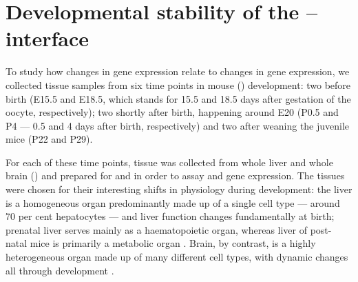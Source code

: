 \chapter{Developmental stability of the -- interface}
\label{sec:trna}

To study how changes in \mrna gene expression relate to changes in \trna gene
expression, we collected tissue samples from six time points in mouse (\mmu)
development: two before birth (E15.5 and E18.5, which stands for \num{15.5} and
\num{18.5} days after gestation of the oocyte, respectively); two shortly after
birth, happening around E20 (P0.5 and P4 --- \num{0.5} and \num{4} days after
birth, respectively) and two after weaning the juvenile mice (P22 and P29).

For each of these time points, tissue was collected from whole liver and whole
brain () and prepared for \rnaseq and  \chipseq in order to
assay \mrna and \trna gene expression. The tissues were chosen for their
interesting shifts in physiology during development: the liver is a homogeneous
organ predominantly made up of a single cell type --- around \num{70} per cent
hepatocytes --- and liver function changes fundamentally at birth; prenatal
liver serves mainly as a haematopoietic organ, whereas liver of post-natal mice
is primarily a metabolic organ \citep{Si-Tayeb:2010}. Brain, by contrast, is a
highly heterogeneous organ made up of many different cell types, with dynamic
changes all through development \citep{Liscovitch:2013}.


